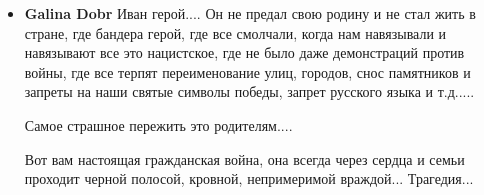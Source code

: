 \begin{itemize}
\item \textbf{Galina Dobr}
Иван герой.... Он не предал свою родину и не стал жить в стране, где бандера
герой, где все смолчали, когда нам навязывали и навязывают все это нацистское,
где не было даже демонстраций против войны, где все терпят переименование улиц,
городов, снос памятников и запреты на наши святые символы победы, запрет
русского языка и т.д.....

Самое страшное пережить это родителям....

Вот вам настоящая гражданская война, она всегда через сердца и семьи проходит
черной полосой, кровной, непримеримой враждой...  Трагедия...
\end{itemize}
